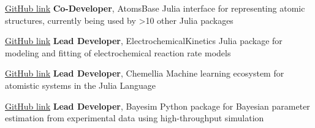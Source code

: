     {\href{https://github.com/https://github.com/JuliaMolSim/AtomsBase.jl}{GitHub link}}
    {\textbf{Co-Developer}, AtomsBase}
    {Julia interface for representing atomic structures, currently being used by >10 other Julia packages}

\vspace{-2mm}
    {\href{https://github.com/BattModels/ElectrochemicalKinetics.jl}{GitHub link}}
    {\textbf{Lead Developer}, ElectrochemicalKinetics}
    {Julia package for modeling and fitting of electrochemical reaction rate models}

\vspace{-2mm}
    {\href{https://github.com/Chemellia}{GitHub link}}
    {\textbf{Lead Developer}, Chemellia}
    {Machine learning ecosystem for atomistic systems in the Julia Language}

\vspace{-2mm}
    {\href{https://github.com/PV-Lab/bayesim}{GitHub link}}
    {\textbf{Lead Developer}, Bayesim}
    {Python package for Bayesian parameter estimation from experimental data using high-throughput simulation}
